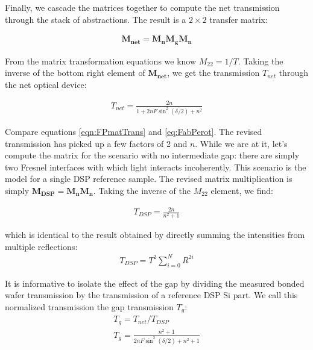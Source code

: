 \documentclass[osajnl,preprint,showpacs,superscriptaddress,12pt]{revtex4-1} %
\begin{document}
Finally, we cascade the matrices together to compute the net transmission through the stack of abstractions.  The result is a $2\times2$ transfer matrix:

\begin{eqnarray}
\boldsymbol{M_{net}}=\boldsymbol{M_n}\boldsymbol{M_g}\boldsymbol{M_n}
\end{eqnarray}

From the matrix transformation equations \cite{2007fuph.book.....S} we know $M_{22}=1/T$.  Taking the inverse of the bottom right element of $\boldsymbol{M_{net}}$, we get the transmission $T_{net}$ through the net optical device:

\begin{eqnarray}
T_{net}=\frac{2 n}{1+ 2n F\sin ^2(\delta/2)+n^2} \label{eqn:FPmatTrans}
\end{eqnarray}

Compare equations \ref{eqn:FPmatTrans} and \ref{eq:FabPerot}.  The revised transmission has picked up a few factors of 2 and $n$.  While we are at it, let's compute the matrix for the scenario with no intermediate gap: there are simply two Fresnel interfaces with which light interacts incoherently.  This scenario is the model for a single DSP reference sample. The revised matrix multiplication is simply $\boldsymbol{M_{DSP}}=\boldsymbol{M_n}\boldsymbol{M_n}$.  Taking the inverse of the $M_{22}$ element, we find:

\begin{eqnarray}
T_{DSP}=\frac{2 n}{n^2+1}\label{eqn:EqofSummedSlab}
\end{eqnarray}

which is identical to the result obtained by directly summing the intensities from multiple reflections:
\begin{eqnarray}
T_{DSP}=T^2 \sum_{i=0}^{N}R^{2i} \label{eqn:multsum}
\end{eqnarray}

It is informative to isolate the effect of the gap by dividing the measured bonded wafer transmission by the transmission of a reference DSP Si part.  We call this normalized transmission the gap transmission $T_{g}$:
\begin{eqnarray}
T_{g} = T_{net}/T_{DSP} \\
T_{g} = \frac{n^2+1}{2 n F \sin ^2(\delta/2)+n^2+1} \label{eqn:Tetalon}
\end{eqnarray}








\end{document}
